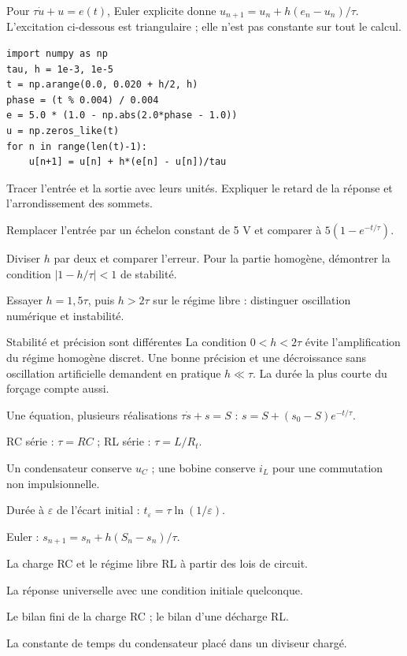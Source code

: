 Pour $\tau\dot u+u=e(t)$, Euler explicite donne $u_{n+1}=u_n+h(e_n-u_n)/\tau$. L’excitation ci-dessous est triangulaire ; elle n’est pas constante sur tout le calcul.
\begin{verbatim}
import numpy as np
tau, h = 1e-3, 1e-5
t = np.arange(0.0, 0.020 + h/2, h)
phase = (t % 0.004) / 0.004
e = 5.0 * (1.0 - np.abs(2.0*phase - 1.0))
u = np.zeros_like(t)
for n in range(len(t)-1):
    u[n+1] = u[n] + h*(e[n] - u[n])/tau
\end{verbatim}
\begin{questions}
\item Tracer l’entrée et la sortie avec leurs unités. Expliquer le retard de la réponse et l’arrondissement des sommets.
\item Remplacer l’entrée par un échelon constant de 5 V et comparer à $5(1-e^{-t/\tau})$.
\item Diviser $h$ par deux et comparer l’erreur. Pour la partie homogène, démontrer la condition $|1-h/\tau|<1$ de stabilité.
\item Essayer $h=1{,}5\tau$, puis $h>2\tau$ sur le régime libre : distinguer oscillation numérique et instabilité.
\end{questions}
\begin{piege}{Stabilité et précision sont différentes}
La condition $0<h<2\tau$ évite l’amplification du régime homogène discret. Une bonne précision et une décroissance sans oscillation artificielle demandent en pratique $h\ll\tau$. La durée la plus courte du forçage compte aussi.
\end{piege}


\begin{loi}{Une équation, plusieurs réalisations}
$\tau\dot s+s=S$ : $s=S+(s_0-S)e^{-t/\tau}$.\par RC série : $\tau=RC$ ; RL série : $\tau=L/R_t$.\par Un condensateur conserve $u_C$ ; une bobine conserve $i_L$ pour une commutation non impulsionnelle.\par Durée à $\varepsilon$ de l’écart initial : $t_\varepsilon=\tau\ln(1/\varepsilon)$.\par Euler : $s_{n+1}=s_n+h(S_n-s_n)/\tau$.
\end{loi}
\begin{questions}
\item La charge RC et le régime libre RL à partir des lois de circuit.
\item La réponse universelle avec une condition initiale quelconque.
\item Le bilan fini de la charge RC ; le bilan d’une décharge RL.
\item La constante de temps du condensateur placé dans un diviseur chargé.
\end{questions}

